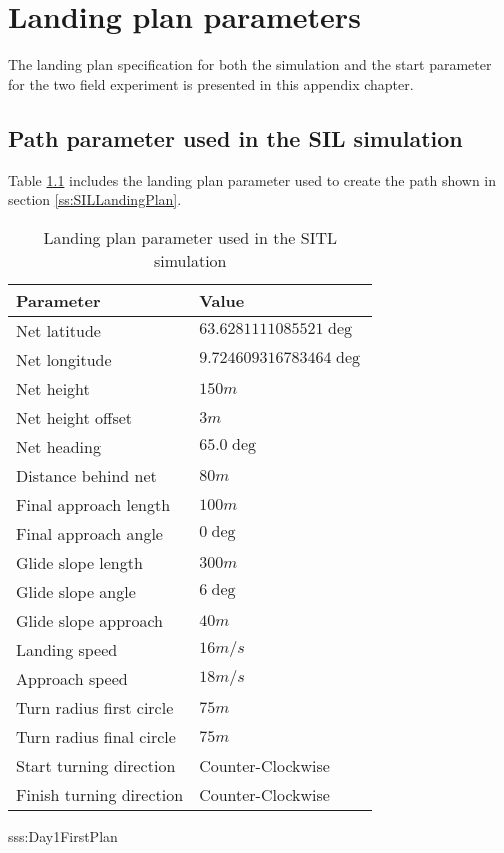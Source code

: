 \chapter{Landing plan parameters}
The landing plan specification for both the simulation and the start parameter for the two field experiment is presented in this appendix chapter.
\section{Path parameter used in the SIL simulation}\label{AP:SpecSIL}
Table \ref{AP:TB:landingSITL} includes the landing plan parameter used to create the path shown in section \ref{ss:SILLandingPlan}.
\begin{table}[H]
\centering
\begin{tabular}{| p{4cm} | p{4cm} |}
\hline
\textbf{Parameter}			& \textbf{Value}			\\ \hline
Net latitude				& $63.6281111085521 \deg$ 	\\ \hline
Net longitude				& $9.724609316783464 \deg$ 	\\ \hline
Net height					& $150 m$					\\ \hline
Net height offset			& $3 m$ 	\\ \hline
Net heading					& $65.0 \deg$				\\ \hline
Distance behind net			& $80 m$					\\ \hline
Final approach length		& $100 m$					\\ \hline
Final approach angle		& $0 \deg$					\\ \hline
Glide slope length			& $300 m $					\\ \hline
Glide slope angle			& $6 \deg$					\\ \hline
Glide slope approach		& $40 m$					\\ \hline
Landing speed				& $16 m/s$					\\ \hline
Approach speed				& $18 m/s$					\\ \hline
Turn radius first circle	& $75 m$					\\ \hline
Turn radius final circle	& $75 m$					\\ \hline
Start turning direction		& Counter-Clockwise			\\ \hline
Finish turning direction	& Counter-Clockwise			\\ \hline
\end{tabular}
\caption{Landing plan parameter used in the SITL simulation}
\label{AP:TB:landingSITL}
\end{table}
sss:Day1FirstPlan
